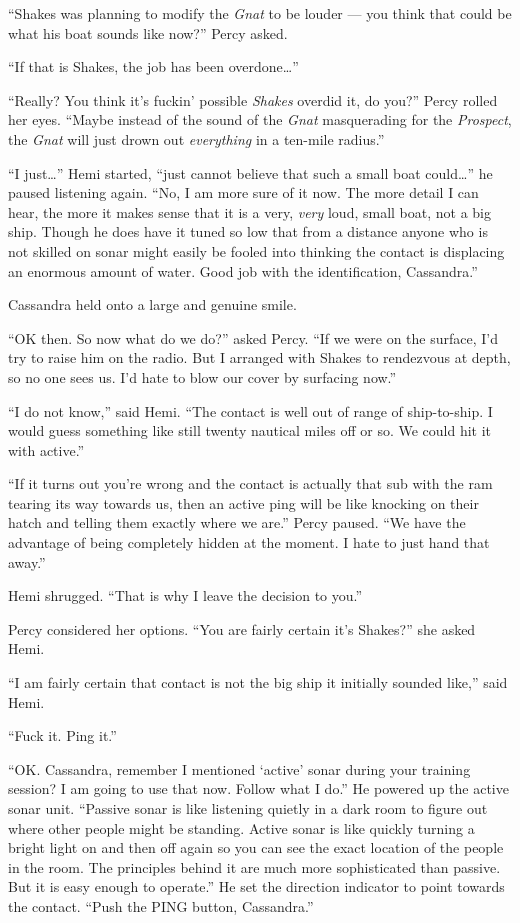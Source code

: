 \documentclass[
]{scrbook}
\begin{document}
``Shakes was planning to modify the \emph{Gnat} to be louder --- you
think that could be what his boat sounds like now?'' Percy asked.

``If that is Shakes, the job has been overdone\ldots{}''

``Really? You think it's fuckin' possible \emph{Shakes} overdid it, do
you?'' Percy rolled her eyes. ``Maybe instead of the sound of the
\emph{Gnat} masquerading for the \emph{Prospect}, the \emph{Gnat} will
just drown out \emph{everything} in a ten-mile radius.''

``I just\ldots{}'' Hemi started, ``just cannot believe that such a small
boat could\ldots{}'' he paused listening again. ``No, I am more sure of
it now. The more detail I can hear, the more it makes sense that it is a
very, \emph{very} loud, small boat, not a big ship. Though he does have
it tuned so low that from a distance anyone who is not skilled on sonar
might easily be fooled into thinking the contact is displacing an
enormous amount of water. Good job with the identification, Cassandra.''

Cassandra held onto a large and genuine smile.

``OK then. So now what do we do?'' asked Percy. ``If we were on the
surface, I'd try to raise him on the radio. But I arranged with Shakes
to rendezvous at depth, so no one sees us. I'd hate to blow our cover by
surfacing now.''

``I do not know,'' said Hemi. ``The contact is well out of range of
ship-to-ship. I would guess something like still twenty nautical miles
off or so. We could hit it with active.''

``If it turns out you're wrong and the contact is actually that sub with
the ram tearing its way towards us, then an active ping will be like
knocking on their hatch and telling them exactly where we are.'' Percy
paused. ``We have the advantage of being completely hidden at the
moment. I hate to just hand that away.''

Hemi shrugged. ``That is why I leave the decision to you.''

Percy considered her options. ``You are fairly certain it's Shakes?''
she asked Hemi.

``I am fairly certain that contact is not the big ship it initially
sounded like,'' said Hemi.

``Fuck it. Ping it.''

``OK. Cassandra, remember I mentioned `active' sonar during your
training session? I am going to use that now. Follow what I do.'' He
powered up the active sonar unit. ``Passive sonar is like listening
quietly in a dark room to figure out where other people might be
standing. Active sonar is like quickly turning a bright light on and
then off again so you can see the exact location of the people in the
room. The principles behind it are much more sophisticated than passive.
But it is easy enough to operate.'' He set the direction indicator to
point towards the contact. ``Push the PING button, Cassandra.''
\end{document}
